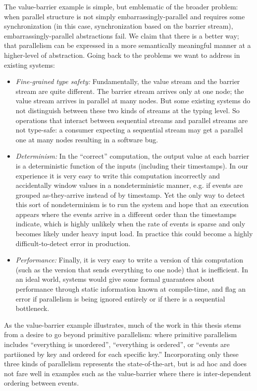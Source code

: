 The value-barrier example is simple, but emblematic of the broader problem: when parallel structure is not simply embarrassingly-parallel and requires some synchronization (in this case, synchronization based on the barrier stream), embarrassingly-parallel abstractions fail.
We claim that there is a better way; that parallelism can be expressed in a more semantically meaningful manner at a higher-level of abstraction.
Going back to the problems we want to address in existing systems:
\begin{itemize}
  \item \emph{Fine-grained type safety:} Fundamentally, the value stream and the barrier stream are quite different. The barrier stream arrives only at one node; the value stream arrives in parallel at many nodes. But some existing systems do not distinguish between these two kinds of streams at the typing level. So operations that interact between sequential streams and parallel streams are not type-safe: a consumer expecting a sequential stream may get a parallel one at many nodes resulting in a software bug.
  \item \emph{Determinism:} In the ``correct'' computation, the output value at each barrier is a deterministic function of the inputs (including their timestamps). In our experience it is very easy to write this computation incorrectly and accidentally window values in a nondeterministic manner, e.g. if events are grouped as-they-arrive instead of by timestamp. Yet the only way to detect this sort of nondeterminism is to run the system and hope that an execution appears where the events arrive in a different order than the timestamps indicate, which is highly unlikely when the rate of events is sparse and only becomes likely under heavy input load. In practice this could become a highly difficult-to-detect error in production.
  \item \emph{Performance:} Finally, it is very easy to write a version of this computation (such as the \naive{} version that sends everything to one node) that is inefficient. In an ideal world, systems would give some formal guarantees about performance through static information known at compile-time, and flag an error if parallelism is being ignored entirely or if there is a sequential bottleneck.
\end{itemize}

As the value-barrier example illustrates, much of the work in this thesis stems from a desire to go beyond primitive parallelism: where primitive parallelism includes ``everything is unordered'', ``everything is ordered'', or ``events are partiioned by key and ordered for each specific key.'' Incorporating only these three kinds of parallelism represents the state-of-the-art, but is ad hoc and does not fare well in examples such as the value-barrier where there is inter-dependent ordering between events.

